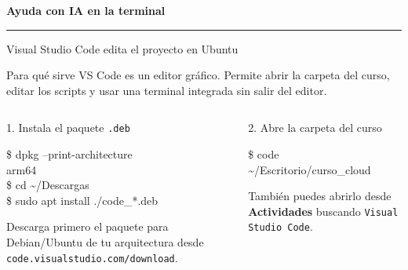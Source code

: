 \documentclass[aspectratio=169,10pt,c]{beamer}
\begin{document}
\begin{frame}[plain]
\vfill
\begin{center}
{\fontsize{29}{34}\selectfont\bfseries Ayuda con IA en la terminal}\par
\vspace{4mm}
{\color{utpRojo}\rule{8.5cm}{1.2pt}}
\end{center}
\vfill
\end{frame}

\begin{frame}{Visual Studio Code edita el proyecto en Ubuntu}
\begin{block}{Para qué sirve}
\small VS Code es un editor gráfico. Permite abrir la carpeta del curso, editar los scripts y usar una terminal integrada sin salir del editor.
\end{block}
\begin{columns}[T,onlytextwidth]
\begin{exampleblock}{1. Instala el paquete \texttt{.deb}}
\begin{terminal}\footnotesize
\$ dpkg --print-architecture\\
arm64\\
\$ cd \textasciitilde/Descargas\\
\$ sudo apt install ./code\_*.deb
\end{terminal}
\small Descarga primero el paquete para Debian/Ubuntu de tu arquitectura desde \texttt{code.visualstudio.com/download}.
\end{exampleblock}
\begin{exampleblock}{2. Abre la carpeta del curso}
\begin{terminal}\footnotesize
\$ code \textasciitilde/Escritorio/curso\_cloud
\end{terminal}
\small También puedes abrirlo desde \textbf{Actividades} buscando \texttt{Visual Studio Code}.
\end{exampleblock}
\end{columns}
\end{frame}
\end{document}
